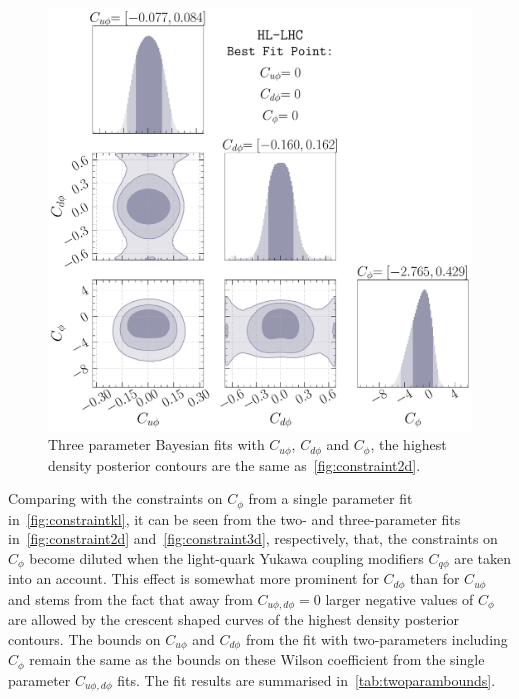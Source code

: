 \begin{figure}[t!]
	\centering
	\includegraphics[width =0.65\linewidth]{fig/kappa_u-kappa_d-kappa_l-HL-LHC.pdf}
	\caption{ Three parameter Bayesian fits with $C_{u\phi}$, $C_{d\phi}$ and $C_\phi$, the highest density posterior contours are the same as~\autoref{fig:constraint2d}.}
	\label{fig:constraint3d}
\end{figure}
Comparing with the constraints on $C_\phi$ from a single parameter fit in~\autoref{fig:constraintkl}, it can be seen from the two- and three-parameter fits in~\autoref{fig:constraint2d} and~\autoref{fig:constraint3d}, respectively,  that, the constraints on $C_\phi$ become diluted when the light-quark Yukawa coupling modifiers $C_{q\phi}$ are taken into an account. This effect is somewhat more prominent for $C_{d\phi}$ than for $C_{u\phi}$ and stems from the fact that away from $C_{u\phi,d\phi} = 0$ larger negative values of $C_\phi$ are allowed by the crescent shaped curves of the highest density posterior contours. The bounds on $C_{u\phi}$ and $C_{d\phi}$ from the fit with two-parameters including $C_\phi$ remain the same as the bounds on these Wilson coefficient from the single parameter $C_{u\phi,d\phi}$ fits.  The fit results are summarised in~\autoref{tab:twoparambounds}. 
